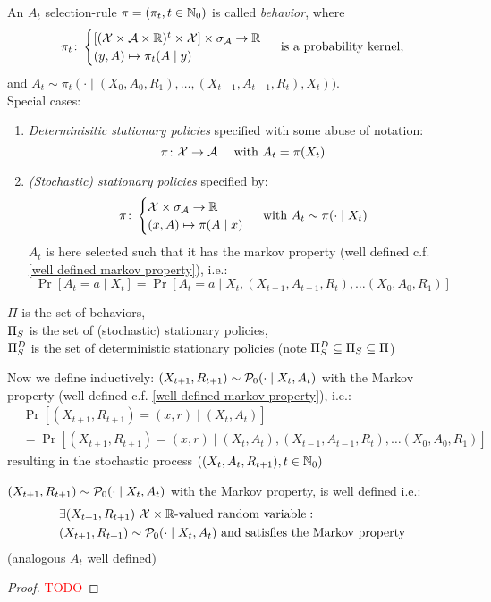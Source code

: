 \begin{definition} An \(A_t\) selection-rule \(\pi=(\pi_t,t\in\mathbb{N}_0)\) is called \emph{behavior}, where
	\[ 
		\pi_t\colon
		\begin{cases}
			[(\mathcal{X}\times\mathcal{A}\times\mathbb{R})^t\times\mathcal{X}]\times\sigma_{\mathcal{A}} \to \mathbb{R} \\
			(y,A)\mapsto \pi_t(A\mid y)
		\end{cases} \text{ is a probability kernel,}
	\]
	and \(A_t\sim \pi_t(\cdot\mid (X_0,A_0,R_1), \dots,(X_{t-1},A_{t-1},R_t),X_t))\).\\
	Special cases:
	\begin{enumerate}
		\item \emph{Determinisitic stationary policies} specified with some abuse of notation:
		\[\leavevmode \pi\colon\cX\to\cA \quad\text{ with }A_t=\pi(X_t)\]
		\item \emph{(Stochastic) stationary policies} specified by:
		\[\pi\colon \begin{cases}
		\mathcal{X}\times\sigma_{\mathcal{A}}\to\mathbb{R}\\
		(x,A)\mapsto \pi(A\mid x)
		\end{cases} \text{ with } A_t\sim\pi(\cdot\mid X_t) 
		\]
		\(A_t\) is here selected such that it has the markov property (well defined c.f. \ref{well defined markov property}), i.e.:
		\[\Pr[A_t=a\mid X_t]=\Pr[A_t=a\mid X_t, (X_{t-1},A_{t-1},R_t), \dots (X_0,A_0,R_1)] \]
	\end{enumerate}
	\(\Pi\) is the set of behaviors,\\
	\(\Pi_S\) is the set of (stochastic) stationary policies, \\
	\(\Pi_S^D\) is the set of deterministic stationary policies (note \(\Pi_S^D\subseteq\Pi_S\subseteq \Pi \))
\end{definition}

Now we define inductively: \((X_{t+1}, R_{t+1})\sim\mathcal{P}_0(\cdot\mid X_t, A_t)\) with the Markov property (well defined c.f. \ref{well defined markov property}), i.e.:
\begin{align}
\label{X,R Markov}
	&\Pr[(X_{t+1}, R_{t+1})=(x,r)\mid (X_t,A_t)]\\
	&=\Pr[(X_{t+1},R_{t+1})=(x,r) \mid (X_t,A_t),(X_{t-1},A_{t-1},R_t), 
	\dots (X_0,A_0,R_1)] \nonumber
\end{align}
resulting in the stochastic process \(((X_t,A_t,R_{t+1}), t\in \mathbb{N}_0)\)
\begin{remark}\label{well defined markov property}
	\((X_{t+1}, R_{t+1})\sim\mathcal{P}_0(\cdot\mid X_t, A_t)\) with the Markov property, is well defined i.e.:
	\begin{align*}
		&\exists (X_{t+1}, R_{t+1})\ \mathcal{X}\times\mathbb{R}\text{-valued random variable}: \\ 
		&(X_{t+1}, R_{t+1})\sim\mathcal{P}_0(\cdot\mid X_t, A_t) \text{ and satisfies the Markov property}
	\end{align*}
	(analogous \(A_t\) well defined)
\end{remark}
\begin{proof}
	\textcolor{red}{TODO}
\end{proof}



